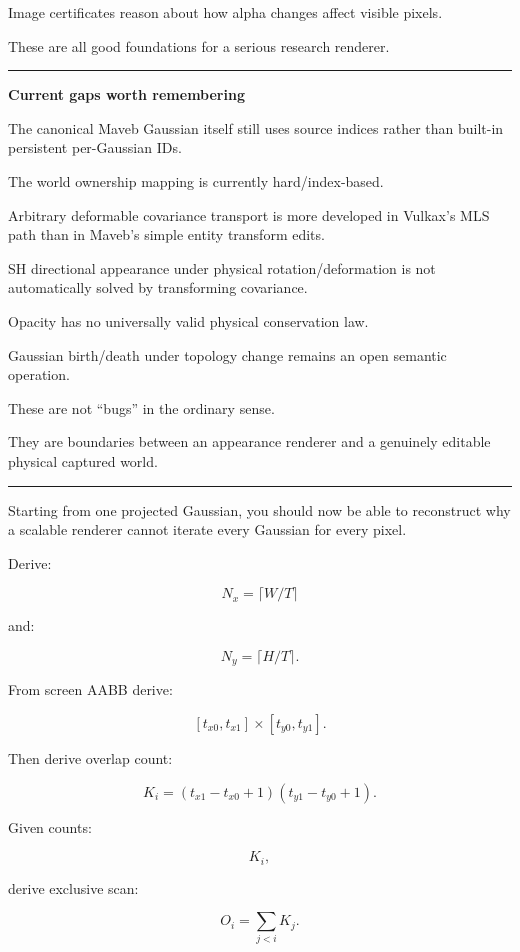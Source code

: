 Image certificates reason about how alpha changes affect visible pixels.

These are all good foundations for a serious research renderer.

\begin{center}\rule{0.5\linewidth}{0.5pt}\end{center}

\textbf{Current gaps worth remembering}

The canonical Maveb Gaussian itself still uses source indices rather than built-in persistent per-Gaussian IDs.

The world ownership mapping is currently hard/index-based.

Arbitrary deformable covariance transport is more developed in Vulkax's MLS path than in Maveb's simple entity transform edits.

SH directional appearance under physical rotation/deformation is not automatically solved by transforming covariance.

Opacity has no universally valid physical conservation law.

Gaussian birth/death under topology change remains an open semantic operation.

These are not ``bugs'' in the ordinary sense.

They are boundaries between an appearance renderer and a genuinely editable physical captured world.

\begin{center}\rule{0.5\linewidth}{0.5pt}\end{center}

Starting from one projected Gaussian, you should now be able to reconstruct why a scalable renderer cannot iterate every Gaussian for every pixel.

Derive:

\[
N_x=
\lceil W/T\rceil
\]

and:

\[
N_y=
\lceil H/T\rceil.
\]

From screen AABB derive:

\[
[t_{x0},t_{x1}]
\times
[t_{y0},t_{y1}].
\]

Then derive overlap count:

\[
K_i=
(t_{x1}-t_{x0}+1)
(t_{y1}-t_{y0}+1).
\]

Given counts:

\[
K_i,
\]

derive exclusive scan:

\[
O_i=
\sum_{j<i}K_j.
\]

